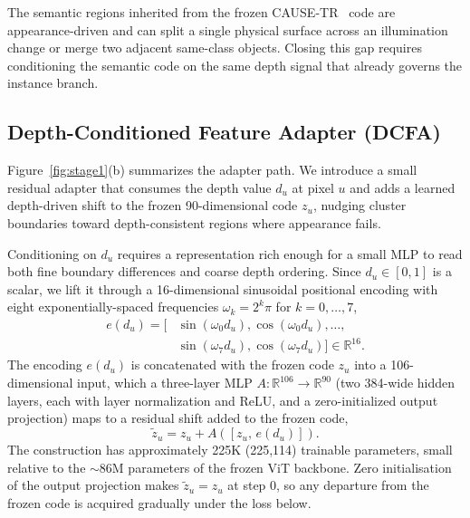 \documentclass{article}
\begin{document}
The semantic regions inherited from the frozen CAUSE-TR~\cite{kim2024cause} code are appearance-driven and can split a single physical surface across an illumination change or merge two adjacent same-class objects. Closing this gap requires conditioning the semantic code on the same depth signal that already governs the instance branch.


\subsection{Depth-Conditioned Feature Adapter (DCFA)}
\label{sec:method:dcfa}

Figure~\ref{fig:stage1}(b) summarizes the adapter path. We introduce a small residual adapter that consumes the depth value $d_u$ at pixel $u$ and adds a learned depth-driven shift to the frozen 90-dimensional code $z_u$, nudging cluster boundaries toward depth-consistent regions where appearance fails.

Conditioning on $d_u$ requires a representation rich enough for a small MLP to read both fine boundary differences and coarse depth ordering. Since $d_u \in [0, 1]$ is a scalar, we lift it through a 16-dimensional sinusoidal positional encoding with eight exponentially-spaced frequencies $\omega_k = 2^k \pi$ for $k = 0, \dots, 7$,
\begin{equation}
\begin{aligned}
e(d_u) = \big[ &\sin(\omega_0 d_u), \cos(\omega_0 d_u), \dots, \\
              &\sin(\omega_7 d_u), \cos(\omega_7 d_u) \big] \in \mathbb{R}^{16}.
\end{aligned}
\label{eq:sinusoid}
\end{equation}
The encoding $e(d_u)$ is concatenated with the frozen code $z_u$ into a 106-dimensional input, which a three-layer MLP $A: \mathbb{R}^{106} \to \mathbb{R}^{90}$ (two 384-wide hidden layers, each with layer normalization and ReLU, and a zero-initialized output projection) maps to a residual shift added to the frozen code,
\begin{equation}
\tilde z_u = z_u + A([z_u,\, e(d_u)]).
\label{eq:residual}
\end{equation}
The construction has approximately 225K (225,114) trainable parameters, small relative to the $\sim$86M parameters of the frozen ViT backbone. Zero initialisation of the output projection makes $\tilde z_u = z_u$ at step 0, so any departure from the frozen code is acquired gradually under the loss below.
\end{document}
